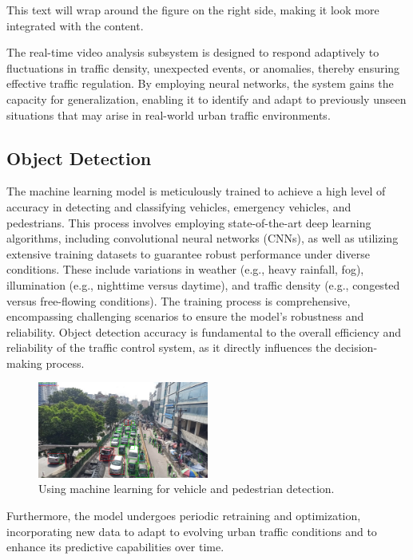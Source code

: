 \documentclass[usenatbib]{tjaa}
\begin{document}
This text will wrap around the figure on the right side, making it look more integrated with the content.

The real-time video analysis subsystem is designed to respond adaptively to fluctuations in traffic density, unexpected events, or anomalies, thereby ensuring effective traffic regulation. By employing neural networks, the system gains the capacity for generalization, enabling it to identify and adapt to previously unseen situations that may arise in real-world urban traffic environments.

\subsection{Object Detection}
The machine learning model is meticulously trained to achieve a high level of accuracy in detecting and classifying vehicles, emergency vehicles, and pedestrians. This process involves employing state-of-the-art deep learning algorithms, including convolutional neural networks (CNNs), as well as utilizing extensive training datasets to guarantee robust performance under diverse conditions. These include variations in weather (e.g., heavy rainfall, fog), illumination (e.g., nighttime versus daytime), and traffic density (e.g., congested versus free-flowing conditions). The training process is comprehensive, encompassing challenging scenarios to ensure the model's robustness and reliability. Object detection accuracy is fundamental to the overall efficiency and reliability of the traffic control system, as it directly influences the decision-making process.

\begin{figure}[H]
    \centering
    \includegraphics[width=0.5\textwidth]{8.png} %
    \caption{Using machine learning for vehicle and pedestrian detection.}
    \label{fig:fullwidth}
\end{figure}

Furthermore, the model undergoes periodic retraining and optimization, incorporating new data to adapt to evolving urban traffic conditions and to enhance its predictive capabilities over time.
\end{document}
